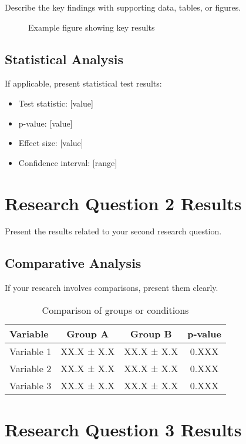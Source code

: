 Describe the key findings with supporting data, tables, or figures.

\begin{figure}[h]
\centering
\caption{Example figure showing key results}
\label{fig:result1}
\end{figure}

\subsection{Statistical Analysis}

If applicable, present statistical test results:

\begin{itemize}
    \item Test statistic: [value]
    \item p-value: [value]
    \item Effect size: [value]
    \item Confidence interval: [range]
\end{itemize}

\section{Research Question 2 Results}

Present the results related to your second research question.

\subsection{Comparative Analysis}

If your research involves comparisons, present them clearly.

\begin{table}[h]
\centering
\caption{Comparison of groups or conditions}
\label{tab:comparison}
\begin{tabular}{|l|c|c|c|}
\hline
\textbf{Variable} & \textbf{Group A} & \textbf{Group B} & \textbf{p-value} \\
\hline
Variable 1 & XX.X ± X.X & XX.X ± X.X & 0.XXX \\
Variable 2 & XX.X ± X.X & XX.X ± X.X & 0.XXX \\
Variable 3 & XX.X ± X.X & XX.X ± X.X & 0.XXX \\
\hline
\end{tabular}
\end{table}

\section{Research Question 3 Results}

